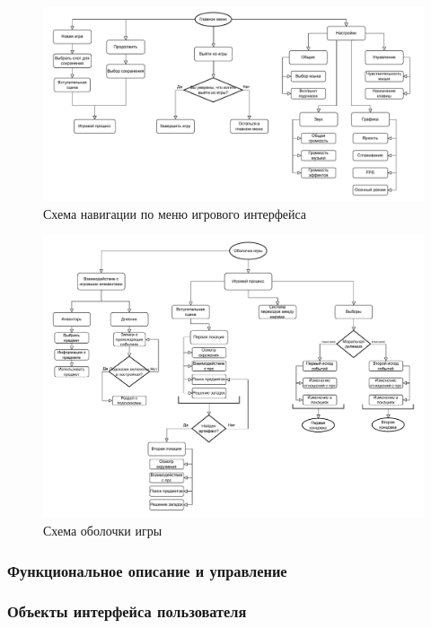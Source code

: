 \documentclass{article}
\begin{document}
	\newpage
	\begin{figure}[h!]
		\centering
		\includegraphics[width=\textwidth]{images/блоксхема1-2.pdf} 
		\caption{Схема навигации по меню игрового интерфейса}
		\label{fig:pdf-example}
	\end{figure}
	
	\begin{figure}[h!]
		\centering
		\includegraphics[width=\textwidth]{images/блоксхема2-3.pdf}
		\caption{Схема оболочки игры}
		\label{fig:pdf-example2}
	\end{figure}
	
	\newpage
	\subsubsection{Функциональное описание и управление}
	
	\subsubsection{Объекты интерфейса пользователя}
	
\end{document}
